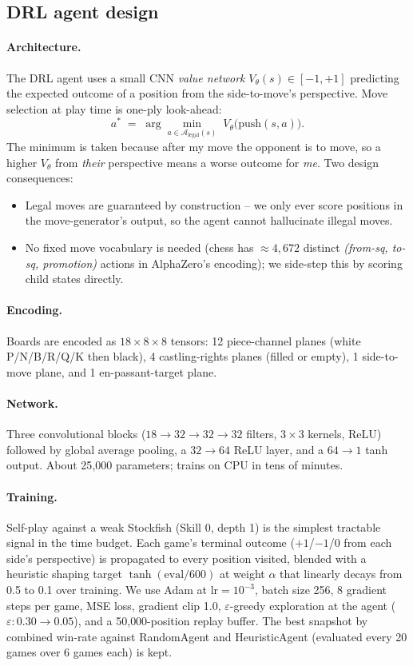 \documentclass[11pt,a4paper]{article}
\begin{document}
\subsection{DRL agent design}
\label{sec:drl}

\paragraph{Architecture.} The DRL agent uses a small CNN
\emph{value network} $V_\theta(s) \in [-1, +1]$ predicting the
expected outcome of a position from the side-to-move's perspective.
Move selection at play time is one-ply look-ahead:
\[
   a^{*} \;=\; \arg\min_{a\in\mathcal{A}_{\text{legal}}(s)}\;
                V_\theta\bigl(\text{push}(s, a)\bigr).
\]
The minimum is taken because after my move the opponent is to move,
so a higher $V_\theta$ from \emph{their} perspective means a worse
outcome for \emph{me}. Two design consequences:
\begin{itemize}
  \item Legal moves are guaranteed by construction -- we only ever
    score positions in the move-generator's output, so the agent
    cannot hallucinate illegal moves.
  \item No fixed move vocabulary is needed (chess has $\approx 4{,}672$
    distinct \emph{(from-sq, to-sq, promotion)} actions in AlphaZero's
    encoding); we side-step this by scoring child states directly.
\end{itemize}

\paragraph{Encoding.} Boards are encoded as $18\!\times\!8\!\times\!8$
tensors: 12 piece-channel planes (white P/N/B/R/Q/K then black), 4
castling-rights planes (filled or empty), 1 side-to-move plane, and 1
en-passant-target plane.

\paragraph{Network.} Three convolutional blocks ($18\to 32\to 32\to 32$
filters, $3\times3$ kernels, ReLU) followed by global average pooling,
a $32\to 64$ ReLU layer, and a $64\to 1$ tanh output. About 25{,}000
parameters; trains on CPU in tens of minutes.

\paragraph{Training.} Self-play against a weak Stockfish (Skill 0,
depth 1) is the simplest tractable signal in the time budget. Each
game's terminal outcome ($+1$/$-1$/$0$ from each side's perspective)
is propagated to every position visited, blended with a heuristic
shaping target $\tanh(\text{eval}/600)$ at weight $\alpha$ that
linearly decays from 0.5 to 0.1 over training. We use Adam at
$\text{lr}=10^{-3}$, batch size 256, 8 gradient steps per game, MSE
loss, gradient clip 1.0, $\varepsilon$-greedy exploration at the agent
($\varepsilon: 0.30\!\to\!0.05$), and a 50{,}000-position replay
buffer. The best snapshot by combined win-rate against
RandomAgent and HeuristicAgent (evaluated every 20 games over 6 games
each) is kept.
\end{document}
